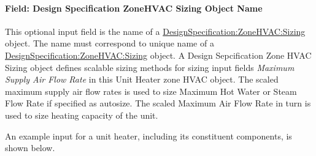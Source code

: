 \paragraph{Field: Design Specification ZoneHVAC Sizing Object Name}\label{field-design-specification-zonehvac-sizing-object-name-3}

This optional input field is the name of a \hyperref[designspecificationzonehvacsizing]{DesignSpecification:ZoneHVAC:Sizing} object. The name must correspond to unique name of a \hyperref[designspecificationzonehvacsizing]{DesignSpecification:ZoneHVAC:Sizing} object. A Design Sepcification Zone HVAC Sizing object defines scalable sizing methods for sizing input fields \emph{Maximum Supply Air Flow Rate} in this Unit Heater zone HVAC object. The scaled maximum supply air flow rates is used to size Maximum Hot Water or Steam Flow Rate if specified as autosize. The scaled Maximum Air Flow Rate in turn is used to size heating capacity of the unit.

An example input for a unit heater, including its constituent components, is shown below.


